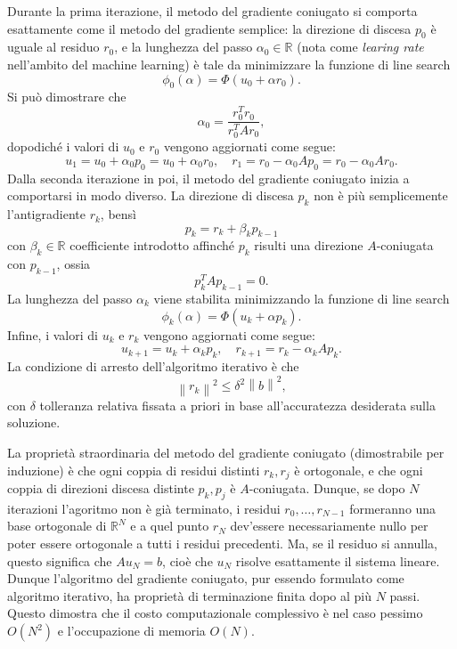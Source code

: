 \documentclass[a4paper,11pt]{article}
\newcommand{\R}{\mathbb{R}}
\newcommand{\norm}[1]{\left\lVert#1\right\rVert}
\begin{document}
Durante la prima iterazione, il metodo del gradiente
coniugato si comporta esattamente come il metodo del
gradiente semplice: la direzione di discesa $p_0$
è uguale al residuo $r_0$, e la lunghezza del passo
$\alpha_0 \in \R$ (nota come \emph{learing rate} nell'ambito del
machine learning) è tale da minimizzare la funzione di line search
\[
\phi_0(\alpha) = \Phi(u_0 + \alpha r_0).
\]
Si può dimostrare che
\[
\alpha_0 = \frac{r_0^T r_0}{r_0^T A r_0},
\]
dopodiché i valori di $u_0$ e $r_0$ vengono aggiornati
come segue:
\[
u_1 = u_0 + \alpha_0 p_0 = u_0 + \alpha_0 r_0, \quad
r_1 = r_0 - \alpha_0 A p_0 = r_0 - \alpha_0 A r_0.
\]
Dalla seconda iterazione in poi, il metodo del gradiente
coniugato inizia a comportarsi in modo diverso.
La direzione di discesa $p_k$ non è più semplicemente
l'antigradiente $r_k$, bensì
\[
p_k = r_k + \beta_k p_{k-1}
\]
con $\beta_k \in \R$ coefficiente introdotto affinché
$p_k$ risulti una direzione $A$-coniugata con $p_{k-1}$, ossia
\[
p_k^T A p_{k-1} = 0.
\]
La lunghezza del passo $\alpha_k$ viene stabilita minimizzando
la funzione di line search
\[
\phi_k(\alpha) = \Phi(u_k + \alpha p_k).
\]
Infine, i valori di $u_k$ e $r_k$ vengono aggiornati
come segue:
\[
u_{k+1} = u_k + \alpha_k p_k, \quad
r_{k+1} = r_k - \alpha_k A p_k.
\]
La condizione di arresto dell'algoritmo iterativo è che
\[
\norm{r_k}^2 \leq \delta^2 \norm{b}^2,
\]
con $\delta$ tolleranza relativa fissata a priori
in base all'accuratezza desiderata sulla soluzione.

La proprietà straordinaria del metodo del gradiente coniugato
(dimostrabile per induzione) è che ogni coppia di residui
distinti $r_k,r_j$ è ortogonale, e che ogni coppia di
direzioni discesa distinte $p_k,p_j$ è $A$-coniugata.
Dunque, se dopo $N$ iterazioni l'agoritmo non è già
terminato, i residui $r_0,\dots,r_{N-1}$
formeranno una base ortogonale di $\R^N$
e a quel punto $r_N$ dev'essere necessariamente nullo
per poter essere ortogonale a tutti i residui
precedenti. Ma, se il residuo si annulla,
questo significa che $A u_N = b$, cioè che $u_N$ risolve
esattamente il sistema lineare. Dunque l'algoritmo del
gradiente coniugato, pur essendo formulato come
algoritmo iterativo, ha proprietà di terminazione finita
dopo al più $N$ passi. Questo dimostra che il costo computazionale
complessivo è nel caso pessimo $O(N^2)$ e l'occupazione di
memoria $O(N)$.
\end{document}
